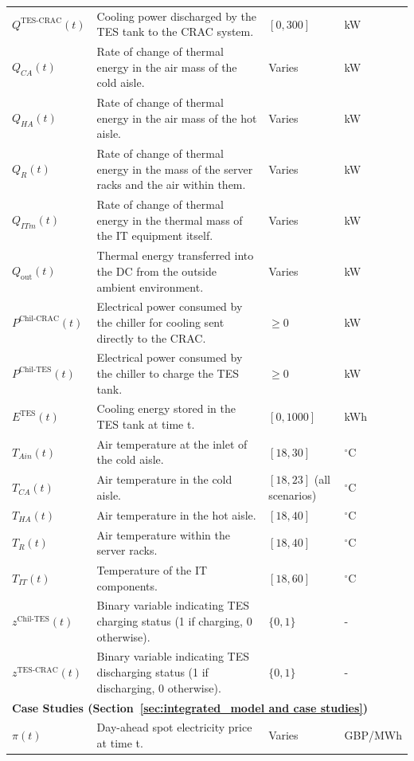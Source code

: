 \documentclass[lettersize,journal]{IEEEtran}
\providecommand{\DIFadd}[1]{{\color{blue}#1}}
\providecommand{\DIFaddFL}[1]{\DIFadd{#1}}
\begin{document}
{{\begin{longtable}{p{} p{} p{} p{}}
$Q^{\mathrm{TES}\text{-}\mathrm{CRAC}}(t)$ & Cooling power discharged by the TES tank to the CRAC system. & $[0, 300]$ &kW \\
$Q_{CA}(t)$ & Rate of change of thermal energy in the air mass of the cold aisle. & Varies &kW \\
$Q_{HA}(t)$ & Rate of change of thermal energy in the air mass of the hot aisle. & Varies &kW \\
$Q_{R}(t)$ & Rate of change of thermal energy in the mass of the server racks and the air within them. & Varies &kW \\
$Q_{ITm}(t)$ & Rate of change of thermal energy in the thermal mass of the IT equipment itself. & Varies &kW \\
$Q_{\mathrm{out}}(t)$ & Thermal energy transferred into the DC from the outside ambient environment. & Varies &kW \\
$P^{\mathrm{Chil}\text{-}\mathrm{CRAC}}(t)$ & Electrical power consumed by the chiller for cooling sent directly to the CRAC. & $\geq 0$ &kW \\
$P^{\mathrm{Chil}\text{-}\mathrm{TES}}(t)$ & Electrical power consumed by the chiller to charge the TES tank. & $\geq 0$ &kW \\
$E^{\mathrm{TES}}(t)$ & Cooling energy stored in the TES tank at time t. & $[0, 1000]$ &kWh \\
$T_{Ain}(t)$ & Air temperature at the inlet of the cold aisle. & \DIFaddFL{$[18, 30]$} & $^{\circ}$C \\
$T_{CA}(t)$ & Air temperature in the cold aisle. & \DIFaddFL{$[18, 23]$ (all scenarios)} & $^{\circ}$C \\
$T_{HA}(t)$ & Air temperature in the hot aisle. & $[18, 40]$ & $^{\circ}$C \\
$T_{R}(t)$ & Air temperature within the server racks. & $[18, 40]$ & $^{\circ}$C \\
$T_{IT}(t)$ & Temperature of the IT components. & $[18, 60]$ & $^{\circ}$C \\
$z^{\mathrm{Chil}\text{-}\mathrm{TES}}(t)$ & Binary variable indicating TES charging status (1 if charging, 0 otherwise). & $\{0, 1\}$ & - \\
$z^{\mathrm{TES}\text{-}\mathrm{CRAC}}(t)$ & Binary variable indicating TES discharging status (1 if discharging, 0 otherwise). & $\{0, 1\}$ & - \\
\midrule
\multicolumn{4}{l}{\textbf{Case Studies (Section~\ref{sec:integrated_model and case studies})}} \\
\midrule
$\pi(t)$ & Day-ahead spot electricity price at time t. & Varies & GBP/MWh \\

\end{longtable}}}
\end{document}
